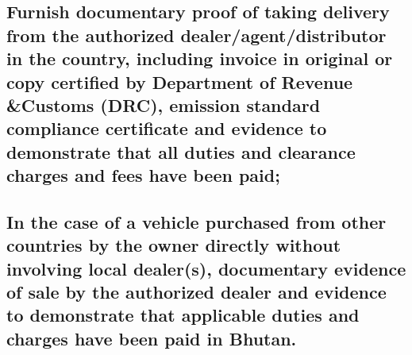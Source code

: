 \documentclass[
]{book}
\begin{document}
\hypertarget{furnish-documentary-proof-of-taking-delivery-from-the-authorized-dealeragentdistributor-in-the-country-including-invoice-in-original-or-copy-certified-by-department-of-revenue-customs-drc-emission-standard-compliance-certificate-and-evidence-to-demonstrate-that-all-duties-and-clearance-charges-and-fees-have-been-paid}{%
\subsection{Furnish documentary proof of taking delivery from the authorized dealer/agent/distributor in the country, including invoice in original or copy certified by Department of Revenue \&Customs (DRC), emission standard compliance certificate and evidence to demonstrate that all duties and clearance charges and fees have been paid;}\label{furnish-documentary-proof-of-taking-delivery-from-the-authorized-dealeragentdistributor-in-the-country-including-invoice-in-original-or-copy-certified-by-department-of-revenue-customs-drc-emission-standard-compliance-certificate-and-evidence-to-demonstrate-that-all-duties-and-clearance-charges-and-fees-have-been-paid}}

\hypertarget{in-the-case-of-a-vehicle-purchased-from-other-countries-by-the-owner-directly-without-involving-local-dealers-documentary-evidence-of-sale-by-the-authorized-dealer-and-evidence-to-demonstrate-that-applicable-duties-and-charges-have-been-paid-in-bhutan.}{%
\subsection{In the case of a vehicle purchased from other countries by the owner directly without involving local dealer(s), documentary evidence of sale by the authorized dealer and evidence to demonstrate that applicable duties and charges have been paid in Bhutan.}\label{in-the-case-of-a-vehicle-purchased-from-other-countries-by-the-owner-directly-without-involving-local-dealers-documentary-evidence-of-sale-by-the-authorized-dealer-and-evidence-to-demonstrate-that-applicable-duties-and-charges-have-been-paid-in-bhutan.}}
\end{document}
